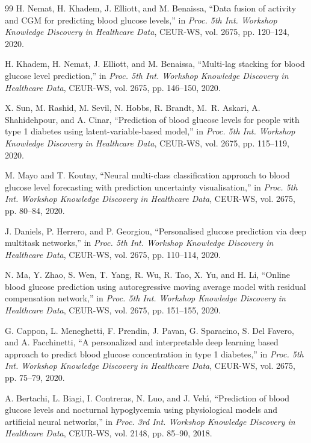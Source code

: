\documentclass[journal]{IEEEtran}
\begin{document}
\begin{thebibliography}{99}
\label{ref66label} H. Nemat, H. Khadem, J. Elliott, and M. Benaissa, ``Data fusion of activity and CGM for predicting blood glucose levels,'' in \emph{Proc. 5th Int. Workshop Knowledge Discovery in Healthcare Data}, CEUR-WS, vol. 2675, pp. 120--124, 2020.

\label{ref67label} H. Khadem, H. Nemat, J. Elliott, and M. Benaissa, ``Multi-lag stacking for blood glucose level prediction,'' in \emph{Proc. 5th Int. Workshop Knowledge Discovery in Healthcare Data}, CEUR-WS, vol. 2675, pp. 146--150, 2020.

\label{ref68label} X. Sun, M. Rashid, M. Sevil, N. Hobbs, R. Brandt, M.~R. Askari, A. Shahidehpour, and A. Cinar, ``Prediction of blood glucose levels for people with type 1 diabetes using latent-variable-based model,'' in \emph{Proc. 5th Int. Workshop Knowledge Discovery in Healthcare Data}, CEUR-WS, vol. 2675, pp. 115--119, 2020.

\label{ref69label} M. Mayo and T. Koutny, ``Neural multi-class classification approach to blood glucose level forecasting with prediction uncertainty visualisation,'' in \emph{Proc. 5th Int. Workshop Knowledge Discovery in Healthcare Data}, CEUR-WS, vol. 2675, pp. 80--84, 2020.

\label{ref71label} J. Daniels, P. Herrero, and P. Georgiou, ``Personalised glucose prediction via deep multitask networks,'' in \emph{Proc. 5th Int. Workshop Knowledge Discovery in Healthcare Data}, CEUR-WS, vol. 2675, pp. 110--114, 2020.

\label{ref72label} N. Ma, Y. Zhao, S. Wen, T. Yang, R. Wu, R. Tao, X. Yu, and H. Li, ``Online blood glucose prediction using autoregressive moving average model with residual compensation network,'' in \emph{Proc. 5th Int. Workshop Knowledge Discovery in Healthcare Data}, CEUR-WS, vol. 2675, pp. 151--155, 2020.

\label{ref73label} G. Cappon, L. Meneghetti, F. Prendin, J. Pavan, G. Sparacino, S. Del Favero, and A. Facchinetti, ``A personalized and interpretable deep learning based approach to predict blood glucose concentration in type 1 diabetes,'' in \emph{Proc. 5th Int. Workshop Knowledge Discovery in Healthcare Data}, CEUR-WS, vol. 2675, pp. 75--79, 2020.

\label{ref58label} A. Bertachi, L. Biagi, I. Contreras, N. Luo, and J. Veh\'{\i}, ``Prediction of blood glucose levels and nocturnal hypoglycemia using physiological models and artificial neural networks,'' in \emph{Proc. 3rd Int. Workshop Knowledge Discovery in Healthcare Data}, CEUR-WS, vol. 2148, pp. 85--90, 2018.


\end{thebibliography}
\end{document}
